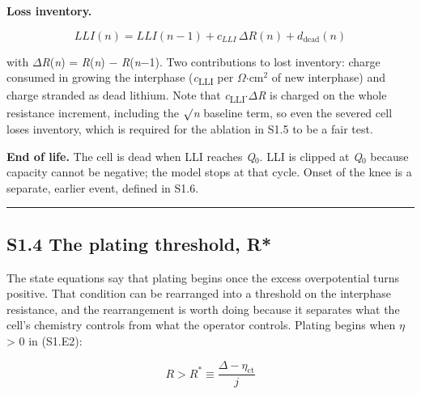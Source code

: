 \documentclass[11pt,a4paper]{article}
\begin{document}
\textbf{Loss inventory.}


\begin{equation}LLI(n) = LLI(n-1) + c_{LLI}\,\Delta R(n) + d_{\text{dead}}(n) \tag{S1.E8}\end{equation}


with \ensuremath{\Delta}\emph{R}(\emph{n}) = \emph{R}(\emph{n}) \ensuremath{-} \emph{R}(\emph{n}\ensuremath{-}1). Two contributions to lost inventory: charge consumed in growing the interphase (\emph{c}\textsubscript{LLI} per \ensuremath{\Omega}\ensuremath{\cdot}cm\ensuremath{^{2}} of new interphase) and charge stranded as dead lithium. Note that \emph{c}\textsubscript{LLI}\ensuremath{\cdot}\ensuremath{\Delta}\emph{R} is charged on the whole resistance increment, including the \ensuremath{\surd}\emph{n} baseline term, so even the severed cell loses inventory, which is required for the ablation in S1.5 to be a fair test.


\textbf{End of life.} The cell is dead when LLI reaches \emph{Q}\ensuremath{_{0}}. LLI is clipped at \emph{Q}\ensuremath{_{0}} because capacity cannot be negative; the model stops at that cycle. Onset of the knee is a separate, earlier event, defined in S1.6.


\par\noindent\rule{\linewidth}{0.4pt}\par


\subsection*{S1.4 The plating threshold, R*}


The state equations say that plating begins once the excess overpotential turns positive. That condition can be rearranged into a threshold on the interphase resistance, and the rearrangement is worth doing because it separates what the cell's chemistry controls from what the operator controls. Plating begins when \emph{\ensuremath{\eta}} > 0 in (S1.E2):


\begin{equation}\boxed{\;R > R^{*} \equiv \frac{\Delta - \eta_{\text{ct}}}{j}\;}\tag{S1.E9}\end{equation}
\end{document}
